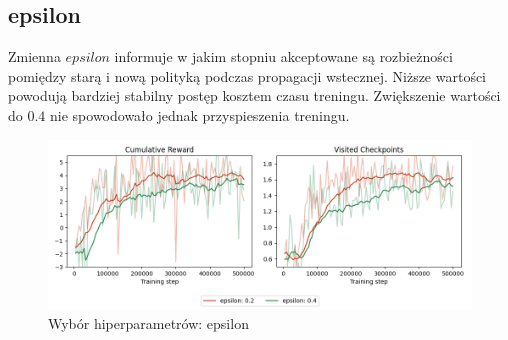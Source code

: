 \subsection{epsilon}
Zmienna $epsilon$ informuje w jakim stopniu akceptowane są rozbieżności pomiędzy starą i nową polityką podczas propagacji wstecznej. Niższe wartości powodują bardziej stabilny postęp kosztem czasu treningu. Zwiększenie wartości do $0.4$ nie spowodowało jednak przyspieszenia treningu.
\begin{figure}[H]
    \centering
    \includegraphics[width=\textwidth]{graphs/hyperparameters_epsilon.png}
    \caption{Wybór hiperparametrów: epsilon}
    \label{fig}
\end{figure}



